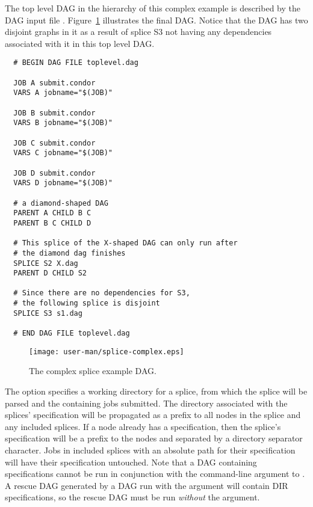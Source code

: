 The top level DAG in the hierarchy of this complex example
is described by the DAG input file .
Figure~\ref{fig:dagman-splice-complex} illustrates the final DAG.
Notice that the DAG has two disjoint graphs in it as a result of splice
S3 not having any dependencies associated with it in this top level DAG.

\begin{verbatim}
  # BEGIN DAG FILE toplevel.dag

  JOB A submit.condor
  VARS A jobname="$(JOB)"

  JOB B submit.condor
  VARS B jobname="$(JOB)"

  JOB C submit.condor
  VARS C jobname="$(JOB)"

  JOB D submit.condor
  VARS D jobname="$(JOB)"

  # a diamond-shaped DAG
  PARENT A CHILD B C
  PARENT B C CHILD D

  # This splice of the X-shaped DAG can only run after
  # the diamond dag finishes
  SPLICE S2 X.dag
  PARENT D CHILD S2

  # Since there are no dependencies for S3,
  # the following splice is disjoint 
  SPLICE S3 s1.dag

  # END DAG FILE toplevel.dag
\end{verbatim}


\begin{figure}
\centering
\texttt{[image: user-man/splice-complex.eps]}
\caption{\label{fig:dagman-splice-complex} The complex splice example DAG.}
\end{figure}

The  option specifies a working directory for a splice,
from which the splice will be parsed and the containing jobs submitted.
The directory associated with the splices'  specification
will be propagated as a prefix to all nodes in the splice and any 
included splices.
If a node already has a  specification, then the splice's
 specification will be a prefix to the nodes and separated by
a directory separator character.
Jobs in included splices with an absolute path for their 
specification will have their  specification untouched.
Note that a DAG containing  specifications cannot be run
in conjunction with the  command-line argument to
.
A rescue DAG generated by a DAG run with the  argument
will contain DIR specifications, so the rescue DAG must be run
\emph{without} the  argument.


